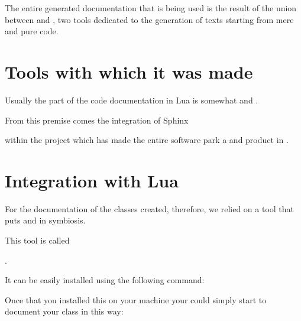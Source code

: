 \documentclass[a4paper,10pt,english,openany,oneside]{sphinxmanual}
\begin{document}
The entire generated documentation that is being used is the result of the union between  and ,
two tools dedicated to the generation of texts starting from mere and pure code.


\section{Tools with which it was made}
\label{\detokenize{documentation:tools-with-which-it-was-made}}
Usually the part of the code documentation in Lua is somewhat  and .

From this premise comes the integration of Sphinx %
\begin{footnote}[2]\sphinxAtStartFootnote
{}
%
\end{footnote} within the project which has made the entire software
park a  and  product in .


\section{Integration with Lua}
\label{\detokenize{documentation:integration-with-lua}}
For the documentation of the classes created, therefore, we relied on a tool that puts   and  in symbiosis.

This tool is called  %
\begin{footnote}[3]\sphinxAtStartFootnote
{}
%
\end{footnote}.

It can be easily installed using the following command:

\begin{sphinxVerbatim}[commandchars=\\\{\}]
  
\end{sphinxVerbatim}

Once that you installed this on your machine your could simply start to document your class in this way:
\end{document}
